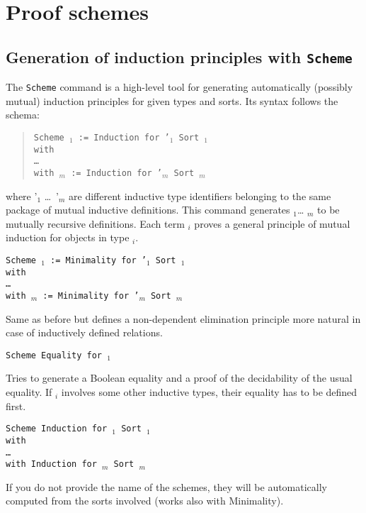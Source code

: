 \chapter{Proof schemes}

\section{Generation of induction principles with {\tt Scheme}}
\label{Scheme}

The {\tt Scheme} command is a high-level tool for generating
automatically (possibly mutual) induction principles for given types
and sorts.  Its syntax follows the schema:
\begin{quote}
{\tt Scheme {\ident$_1$} := Induction for \ident'$_1$ Sort {\sort$_1$} \\
  with\\
  \mbox{}\hspace{0.1cm} \dots\\
        with {\ident$_m$} := Induction for {\ident'$_m$} Sort
        {\sort$_m$}}
\end{quote}
where \ident'$_1$ \dots\ \ident'$_m$ are different inductive type
identifiers belonging to the same package of mutual inductive
definitions. This command generates {\ident$_1$}\dots{} {\ident$_m$}
to be mutually recursive definitions. Each term {\ident$_i$} proves a
general principle of mutual induction for objects in type {\term$_i$}.

\begin{Variants}
\item {\tt Scheme {\ident$_1$} := Minimality for \ident'$_1$ Sort {\sort$_1$} \\
    with\\
    \mbox{}\hspace{0.1cm} \dots\ \\
    with {\ident$_m$} := Minimality for {\ident'$_m$} Sort
    {\sort$_m$}}

  Same as before but defines a non-dependent elimination principle more
  natural in case of inductively defined relations.

\item {\tt Scheme Equality for \ident$_1$}

  Tries to generate a Boolean equality and a proof of the
  decidability of the usual equality. If \ident$_i$ involves
  some other inductive types, their equality has to be defined first.

\item {\tt Scheme Induction for \ident$_1$ Sort {\sort$_1$} \\
  with\\
  \mbox{}\hspace{0.1cm} \dots\\
        with Induction for {\ident$_m$} Sort
        {\sort$_m$}}

  If you do not provide the name of the schemes, they will be automatically
  computed from the sorts involved (works also with Minimality).

\end{Variants}
\label{Scheme-examples}

